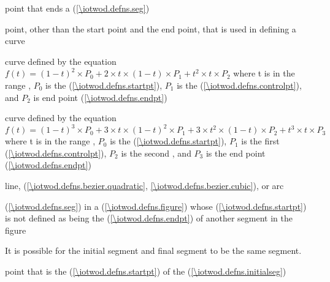 %
point that ends a  (\ref{\iotwod.defns.seg})

%
point, other than the start point and the end point, that is used in defining a curve

%
%
 curve defined by the 
equation $f(t) = (1 - t)^{2} \times P_{0} + 2 \times t \times (1 - t) 
\times P_{1} + t^{2} \times t \times P_{2}$ where t is in the range , $P_{0}$ is the  (\ref{\iotwod.defns.startpt}), $P_{1}$ is the  (\ref{\iotwod.defns.controlpt}), and $P_{2}$ is end point (\ref{\iotwod.defns.endpt})

 curve defined by the 
equation $f(t) = (1 - t)^{3} \times P_{0} + 3 \times t \times (1 - t)^{2} 
\times P_{1} + 3 \times t^{2} \times (1 - t) \times P_{2} + t^{3} \times t 
\times P_{3}$ where t is in the range , $P_{0}$ is the  (\ref{\iotwod.defns.startpt}), $P_{1}$ is the first  (\ref{\iotwod.defns.controlpt}), $P_{2}$ is the second , and $P_{3}$ is the end point (\ref{\iotwod.defns.endpt})

%
line,  (\ref{\iotwod.defns.bezier.quadratic}, \ref{\iotwod.defns.bezier.cubic}), or arc

%
 (\ref{\iotwod.defns.seg}) in a  (\ref{\iotwod.defns.figure}) whose  (\ref{\iotwod.defns.startpt}) is not defined as being the  (\ref{\iotwod.defns.endpt}) of another segment in the figure
\begin{note}
It is possible for the initial segment and final segment to be the same segment.
\end{note}

%
point that is the  (\ref{\iotwod.defns.startpt}) of the  (\ref{\iotwod.defns.initialseg})

